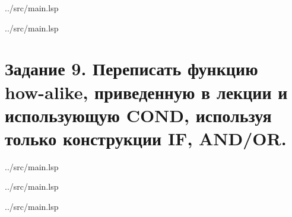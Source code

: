 \begin{lstinputlisting}[
	caption={Задание 8, COND},
	label={lst:t8-1},
	style={lsp},
	linerange={45-46},
	]{../src/main.lsp}
\end{lstinputlisting}

\begin{lstinputlisting}[
	caption={Задание 8, AND/OR},
	label={lst:t8-2},
	style={lsp},
	linerange={48-49},
	]{../src/main.lsp}
\end{lstinputlisting}

\section*{Задание 9. Переписать функцию how-alike, приведенную в лекции и использующую COND, используя только конструкции IF, AND/OR.}

\begin{lstinputlisting}[
	caption={Задание 9},
	label={lst:t9},
	style={lsp},
	linerange={51-56},
	]{../src/main.lsp}
\end{lstinputlisting}

\begin{lstinputlisting}[
	caption={Задание 9, IF},
	label={lst:t9-1},
	style={lsp},
	linerange={58-69},
	]{../src/main.lsp}
\end{lstinputlisting}

\clearpage

\begin{lstinputlisting}[
	caption={Задание 9, AND/OR},
	label={lst:t9-2},
	style={lsp},
	linerange={71-77},
	]{../src/main.lsp}
\end{lstinputlisting}




